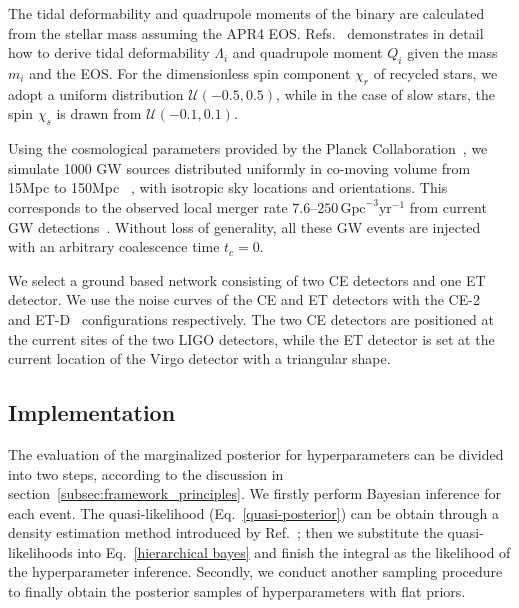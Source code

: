 \documentclass[a4paper,11pt]{article}
\begin{document}
The tidal deformability and quadrupole moments of the binary are calculated from 
the stellar mass assuming the APR4 EOS. Refs.~\cite{Yagi:2013awa,Atta:2024ckt} 
demonstrates in detail how to derive tidal deformability $\Lambda_i$ and 
quadrupole moment $Q_i$ given the mass $m_i$ and the EOS. For the dimensionless 
spin component $\chi_r$ of recycled stars, we adopt a uniform distribution $\mathcal{U}(-0.5,0.5)$, 
while in the case of slow stars, the spin $\chi_s$ is drawn from $\mathcal{U}(-0.1,0.1)$.

Using the cosmological parameters provided by the Planck Collaboration~\cite{Planck:2018vyg}, 
we simulate 1000 GW sources distributed uniformly in co-moving volume from 15Mpc to 150Mpc
~\cite{Fishbach:2018edt,KAGRA:2021duu}, with isotropic sky locations and orientations. 
This corresponds to the observed local merger rate $7.6$--$250\,\mathrm{Gpc}^{-3}\mathrm{yr}^{-1}$ from current GW 
detections~\cite{LIGOScientific:2025pvj,LIGOScientific:2020aai}. Without loss of generality, all 
these GW events are injected with an arbitrary coalescence time $t_c=0$.

We select a ground based network consisting of two CE detectors and one ET 
detector. We use the noise curves of the CE and ET detectors with the CE-2~\cite{Reitze:2019iox,Reitze:2019dyk} 
and ET-D~\cite{Punturo:2010zz,Hild:2010id,Sathyaprakash:2012jk} configurations respectively. 
The two CE detectors are positioned at the current sites of the two LIGO detectors, 
while the ET detector is set at the current location of the Virgo detector with a triangular shape. 

\subsection{Implementation}
\label{subsec:simulation_implementation}

The evaluation of the marginalized posterior for hyperparameters can be divided 
into two steps, according to the discussion in section~\ref{subsec:framework_principles}. 
We firstly perform Bayesian inference for each event. The quasi-likelihood (Eq.~\eqref{quasi-posterior}) 
can be obtain through a density estimation method introduced by Ref.~\cite{Talbot:2020oeu}; 
then we substitute the quasi-likelihoods into Eq.~\eqref{hierarchical bayes} and 
finish the integral as the likelihood of the hyperparameter inference. Secondly, 
we conduct another sampling procedure to finally obtain the posterior samples of 
hyperparameters with flat priors. 
\end{document}
